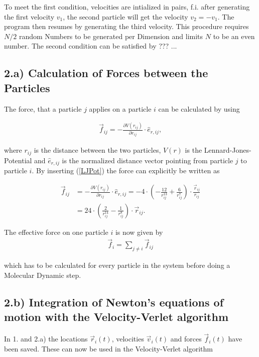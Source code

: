 To meet the first condition, velocities are intialized in pairs, f.i. after generating the first velocity $v_1$, the second particle will get the velocity $v_2 = -v_1$. The program then resumes by generating the third velocity. This procedure requires $N/2$ random Numbers to be generated per Dimension and limits $N$ to be an even number.
The second condition can be satisfied by ??? ... 

\subsection*{2.a) Calculation of Forces between the Particles}

The force, that a particle $j$ applies on a particle $i$ can be calculated by using

\begin{align}
	\vec{f}_{ij}=-\frac{\partial V(r_{ij})}{\partial r_{ij}} \cdot \hat{e}_{r,ij},
\end{align}

where $r_{ij}$ is the distance between the two particles, $V(r)$ is the Lennard-Jones-Potential and $\hat{e}_{r,ij}$ is the normalized distance vector pointing from particle $j$ to particle $i$. By inserting (\ref{LJPot}) the force can explicitly be written as

\begin{align}
	\vec{f}_{ij}&=-\frac{\partial V(r_{ij})}{\partial r_{ij}} \cdot \hat{e}_{r,ij} 
	= - 4 \cdot \left(-\frac{12}{r_{ij}^{13}}+ \frac{6}{r_{ij}^7}\right) \cdot \frac{\vec{r}_{ij}}{r_{ij}} \\
	&= 24 \cdot \left(\frac{2}{r_{ij}^{14}} - \frac{1}{r_{ij}^8}\right) \cdot \vec{r}_{ij}.
\end{align}

The effective force on one particle $i$ is now given by 
\begin{align*}
\vec{f}_i = \sum_{j\neq i} \vec{f}_{ij}
\end{align*}

which has to be calculated for every particle in the system before doing a Molecular Dynamic step.


\subsection*{2.b) Integration of Newton's equations of motion with the Velocity-Verlet algorithm}

In 1. and 2.a) the locations $\vec{r}_i(t)$, velocities $\vec{v}_i(t)$ and forces $\vec{f}_i(t)$ have been saved. These can now be used in the Velocity-Verlet algorithm

